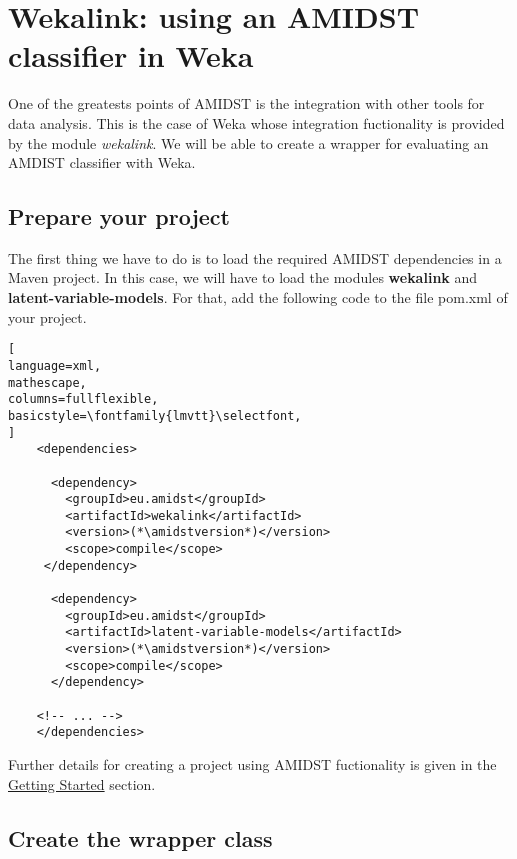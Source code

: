 \documentclass[10pt,a4paper]{article}
\newcommand{\amidstversion}{}
\begin{document}
\section{Wekalink: using an AMIDST classifier in Weka}\label{requirements-amidst-toolbox}


 
One of the greatests points of AMIDST is the integration with other tools for data analysis. This is the case of Weka whose integration fuctionality is provided by the module \textit{wekalink}. We will be able to create a wrapper for evaluating an AMDIST classifier with Weka.



\subsection{Prepare your project}

The first thing we have to do is to load the required AMIDST dependencies in a Maven project. In this case, we will have to load the modules \textbf{wekalink} and \textbf{latent-variable-models}. For that, add the following code to the file pom.xml of your project.

\begin{lstlisting}[
language=xml,
mathescape,
columns=fullflexible,
basicstyle=\fontfamily{lmvtt}\selectfont,
]
    <dependencies>
    
      <dependency>
        <groupId>eu.amidst</groupId>
        <artifactId>wekalink</artifactId>
        <version>(*\amidstversion*)</version>
        <scope>compile</scope>
     </dependency>
     
      <dependency>
        <groupId>eu.amidst</groupId>
        <artifactId>latent-variable-models</artifactId>
        <version>(*\amidstversion*)</version>
        <scope>compile</scope>
      </dependency>
    
    <!-- ... -->
    </dependencies>
\end{lstlisting}


Further details for creating a project using AMIDST fuctionality is given in the \href{../GettingStarted/}{Getting Started} section.

\subsection{Create the wrapper class}
\end{document}
